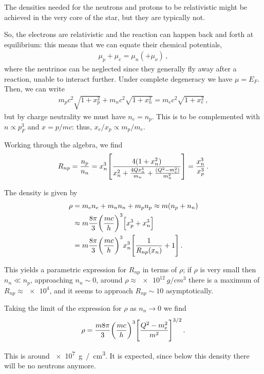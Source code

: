 \documentclass[main.tex]{subfiles}
\begin{document}
The densities needed for the neutrons and protons to be relativistic might be achieved in the very core of the star, but they are typically not. 

So, the electrons are relativistic and the reaction can happen back and forth at equilibrium: this means that we can equate their chemical potentials, 
%
\begin{align}
\mu _p + \mu _e = \mu _n (+ \mu _\nu )
\,,
\end{align}
%
where the neutrinos can be neglected since they generally fly away after a reaction, unable to interact further. 
Under complete degeneracy we have \(\mu = E_F\). 
Then, we can write 
%
\begin{align}
m_p c^2 \sqrt{1 + x_p^2} +
m_n c^2 \sqrt{1 + x_n^2} =
m_e c^2 \sqrt{1 + x_e^2} 
\,,
\end{align}
%
but by charge neutrality we must have \(n_e = n_p\).
This is to be complemented with \(n \propto p_F^3\) and \(x = p / mc\): thus, \(x_e / x_p \propto m_p / m_e\).

Working through the algebra, we find 
%
\begin{align}
R_{np} = \frac{n_p}{n_n} = x_n^3 \qty[
    \frac{4 (1 + x_n^2)}{x_n^2 + \frac{4 Q x_n^3}{m_n} + \frac{(Q^2 -m_e^2)}{m_n^2}} 
] 
= \frac{x_n^3}{x_p^3}
\,.
\end{align}

The density is given by 
%
\begin{align}
\rho &= m_e n_e + m_n n_n + m_p n_p \approx m (n_p + n_n)  \\
&\approx m \frac{8 \pi }{3} \qty(\frac{mc}{h})^3
\qty[x_p^3 + x_n^3]  \\
&= m \frac{8 \pi }{3} \qty(\frac{mc}{h})^3
x_n^3 \qty[ \frac{1}{R_{np} (x_n)} + 1]
\,.
\end{align}
%

This yields a parametric expression for \(R_{np}\) in terms of \(\rho \); if \(\rho \) is very small then \(n_n \ll n_p\), approaching \(n_n \sim 0\), around \(\rho \approx \SI{e12}{g / cm^3}\) there is a maximum of \(R_{np}\approx \num{e4}\), and it seems to approach \(R_{np} \sim 10 \) asymptotically.  

Taking the limit of the expression for  \(\rho \) as \(n_n \to 0\) we find 
%
\begin{align}
\rho = \frac{m 8 \pi }{3} \qty(\frac{mc}{h})^3 \qty[ \frac{Q^2 - m_e^2}{m^2}]^{3/2}
\,.
\end{align}

This is around \SI{e7}{g / cm^3}. It is expected, since below this density there will be no neutrons anymore. 
\end{document}
